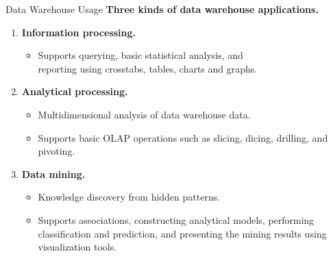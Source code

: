 \begin{frame}{Data Warehouse Usage}
	\textbf{Three kinds of data warehouse applications.}
	\begin{enumerate}
		\item \textbf{\color{airforceblue}Information processing.}
		      \begin{itemize}
			      \item Supports querying, basic statistical analysis, and \\ reporting using crosstabs, tables, charts and graphs.
		      \end{itemize}
		\item \textbf{\color{airforceblue}Analytical processing.}
		      \begin{itemize}
			      \item Multidimensional analysis of data warehouse data.
			      \item Supports basic OLAP operations such as slicing, dicing, drilling, and pivoting.
		      \end{itemize}
		\item \textbf{\color{airforceblue}Data mining.}
		      \begin{itemize}
			      \item Knowledge discovery from hidden patterns.
			      \item Supports associations, constructing analytical models, performing classification and prediction, and presenting the mining results using visualization tools.
		      \end{itemize}
	\end{enumerate}
\end{frame}


